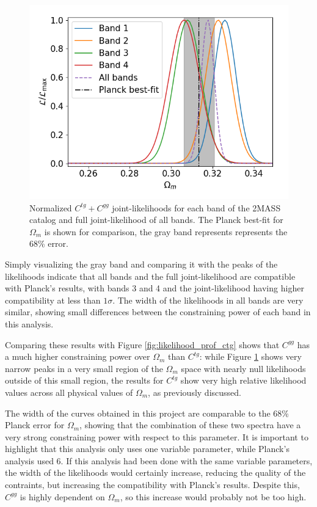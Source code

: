 \documentclass[openany,a4paper,12pt,oneside]{book}
\begin{document}
\begin{spacing}{1.5}
\begin{figure}[!htb]
	\centering
	\includegraphics[width=.7\linewidth]{Imagens/profile_allbands_Nmc2e7.png}
	\caption{Normalized $C^{tg}+C^{gg}$ joint-likelihoods for each band of the 2MASS catalog and full joint-likelihood of all bands. The Planck best-fit for $\Omega_m$ is shown for comparison, the gray band represents represents the 68\% error.}
	\label{fig:likelihood_prof_ctg+cgg}
\end{figure}

Simply visualizing the gray band and comparing it with the peaks of the likelihoods indicate that all bands and the full joint-likelihood are compatible with Planck's results, with bands 3 and 4 and the joint-likelihood having higher compatibility at less than $1\sigma$. The width of the likelihoods in all bands are very similar, showing small differences between the constraining power of each band in this analysis. 

Comparing these results with Figure \ref{fig:likelihood_prof_ctg} shows that $C^{gg}$ has a much higher constraining power over $\Omega_m$ than $C^{tg}$: while Figure \ref{fig:likelihood_prof_ctg+cgg} shows very narrow peaks in a very small region of the $\Omega_m$ space with nearly null likelihoods outside of this small region, the results for $C^{tg}$ show very high relative likelihood values across all physical values of $\Omega_m$, as previously discussed.

The width of the curves obtained in this project are comparable to the 68\% Planck error for $\Omega_m$, showing that the combination of these two spectra have a very strong constraining power with respect to this parameter. It is important to highlight that this analysis only uses one variable parameter, while Planck's analysis used 6. If this analysis had been done with the same variable parameters, the width of the likelihoods would certainly increase, reducing the quality of the contraints, but increasing the compatibility with Planck's results. Despite this, $C^{gg}$ is highly dependent on $\Omega_m$, so this increase would probably not be too high.


\end{spacing}
\end{document}

